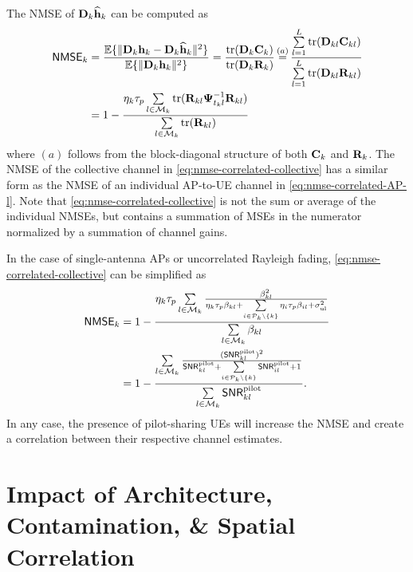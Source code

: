 The \gls{NMSE} of $\mathbf{D}_{k}\widehat{\mathbf{h}}_{k}$ can be computed as \begin{align}\notag
\mathsf{NMSE}_{k} &=\frac{\mathbb{E}\{ \| \mathbf{D}_{k}\mathbf{h}_{k} - \mathbf{D}_{k}\widehat{\mathbf{h}}_{k} \|^2 \}}{ \mathbb{E}\{ \| \mathbf{D}_{k}\mathbf{h}_{k}\|^2 \}} = \frac{\mathrm{tr}( \mathbf{D}_{k}\mathbf{C}_{k}  )}{ \mathrm{tr}( \mathbf{D}_{k}\mathbf{R}_{k}  )}\mathop{=}^{(a)}\frac{\sum\limits_{l=1}^L\mathrm{tr}( \mathbf{D}_{kl}\mathbf{C}_{kl}  )}{ \sum\limits_{l=1}^L\mathrm{tr}( \mathbf{D}_{kl}\mathbf{R}_{kl}  )}\\&=1 - \frac{\eta_k \tau_p \sum\limits_{l \in \mathcal{M}_k} \mathrm{tr}(\mathbf{R}_{kl} \mathbf{\Psi}_{t_kl}^{-1} \mathbf{R}_{kl}) }{ \sum\limits_{l \in \mathcal{M}_k}\mathrm{tr}( \mathbf{R}_{kl}  )} \label{eq:nmse-correlated-collective}
\end{align}
where ${(a)}$ follows from the block-diagonal structure of both $\mathbf{C}_{k}$ and $\mathbf{R}_{k}$. The NMSE of the collective channel in \eqref{eq:nmse-correlated-collective} has a similar form as the NMSE of an individual AP-to-UE channel in \eqref{eq:nmse-correlated-AP-l}. Note that \eqref{eq:nmse-correlated-collective} is not the sum or average of the individual NMSEs, but contains a summation of MSEs in the numerator normalized by a summation of channel gains.
\pagebreak

In the case of single-antenna APs or uncorrelated Rayleigh fading, \eqref{eq:nmse-correlated-collective} can be simplified as
\begin{align}\notag
\mathsf{NMSE}_{k}&=1 - \frac{\eta_k \tau_p \sum\limits_{l \in \mathcal{M}_k} \frac{\beta_{kl}^2}{{ \eta_k\tau_p  \beta_{kl} +\sum\limits_{i \in \mathcal{P}_k\setminus \{ k \}}\eta_i\tau_p  \beta_{il} + \sigma^2_{\mathrm{ul}}}} }{ \sum\limits_{l \in \mathcal{M}_k}\beta_{kl} }\\&=
1 - \frac{\sum\limits_{l \in \mathcal{M}_k}\frac{(\mathsf{SNR}_{kl}^{\text{pilot}})^2}{ \mathsf{SNR}_{kl}^{\text{pilot}} + \sum\limits_{i \in \mathcal{P}_k\setminus \{k\}} \mathsf{SNR}_{il}^{\text{pilot}} +1}}{ \sum\limits_{l \in \mathcal{M}_k} \mathsf{SNR}_{kl}^{\text{pilot}}}. \label{eq:nmse-uncorrelated-collective}
\end{align}
In any case, the presence of pilot-sharing UEs will increase the NMSE and create a correlation between their respective channel estimates.


\section{Impact of Architecture, Contamination, \& Spatial Correlation}\label{sec:impact-on-estimation-accuracy}

